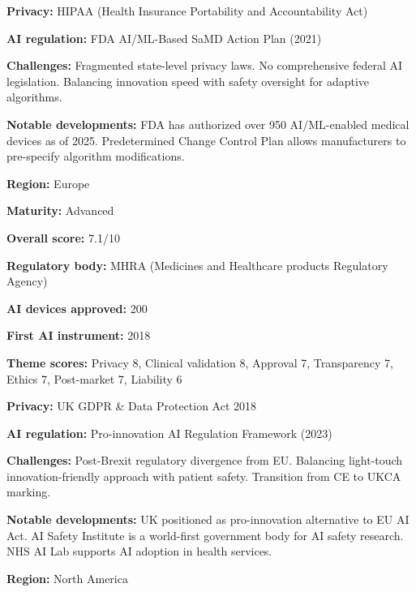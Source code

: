 \noindent\textbf{Privacy:} HIPAA (Health Insurance Portability and Accountability Act)\par
\noindent\textbf{AI regulation:} FDA AI/ML-Based SaMD Action Plan (2021)\par
\noindent\textbf{Challenges:} Fragmented state-level privacy laws. No comprehensive federal AI legislation. Balancing innovation speed with safety oversight for adaptive algorithms.\par
\noindent\textbf{Notable developments:} FDA has authorized over 950 AI/ML-enabled medical devices as of 2025. Predetermined Change Control Plan allows manufacturers to pre-specify algorithm modifications.\par
\vspace{0.55em}
\par
\vspace{0.15em}
\noindent\textbf{Region:} Europe\par
\noindent\textbf{Maturity:} Advanced\par
\noindent\textbf{Overall score:} 7.1/10\par
\noindent\textbf{Regulatory body:} MHRA (Medicines and Healthcare products Regulatory Agency)\par
\noindent\textbf{AI devices approved:} 200\par
\noindent\textbf{First AI instrument:} 2018\par
\noindent\textbf{Theme scores:} Privacy 8, Clinical validation 8, Approval 7, Transparency 7, Ethics 7, Post-market 7, Liability 6\par
\noindent\textbf{Privacy:} UK GDPR \& Data Protection Act 2018\par
\noindent\textbf{AI regulation:} Pro-innovation AI Regulation Framework (2023)\par
\noindent\textbf{Challenges:} Post-Brexit regulatory divergence from EU. Balancing light-touch innovation-friendly approach with patient safety. Transition from CE to UKCA marking.\par
\noindent\textbf{Notable developments:} UK positioned as pro-innovation alternative to EU AI Act. AI Safety Institute is a world-first government body for AI safety research. NHS AI Lab supports AI adoption in health services.\par
\vspace{0.55em}
\par
\vspace{0.15em}
\noindent\textbf{Region:} North America\par
